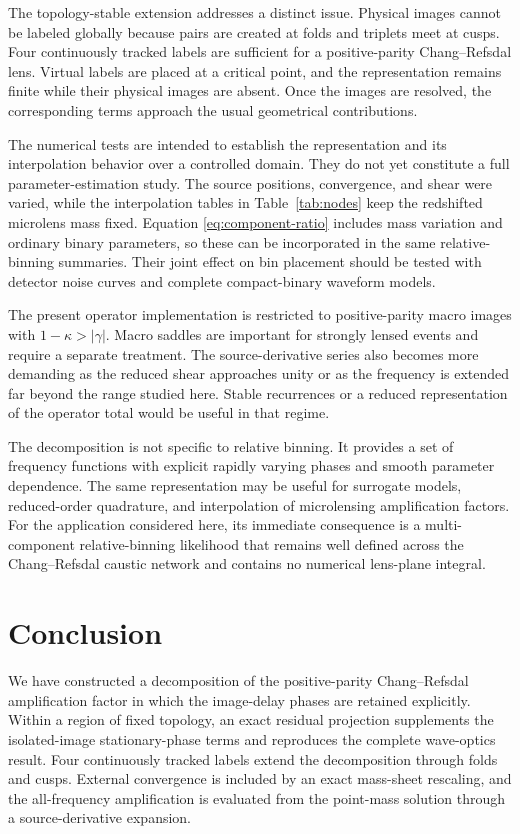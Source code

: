 \documentclass[aps,prd,twocolumn,nofootinbib,superscriptaddress,floatfix]{revtex4-2}
\begin{document}
The topology-stable extension addresses a distinct issue.  Physical images
cannot be labeled globally because pairs are created at folds and triplets
meet at cusps.  Four continuously tracked labels are sufficient for a
positive-parity Chang--Refsdal lens.  Virtual labels are placed at a critical
point, and the representation remains finite while their physical images are
absent.  Once the images are resolved, the corresponding terms approach the
usual geometrical contributions.

The numerical tests are intended to establish the representation and its
interpolation behavior over a controlled domain.  They do not yet constitute
a full parameter-estimation study.  The source positions, convergence, and
shear were varied, while the interpolation tables in
Table~\ref{tab:nodes} keep the redshifted microlens mass fixed.  Equation
\eqref{eq:component-ratio} includes mass variation and ordinary binary
parameters, so these can be incorporated in the same relative-binning
summaries.  Their joint effect on bin placement should be tested with detector
noise curves and complete compact-binary waveform models.

The present operator implementation is restricted to positive-parity macro
images with $1-\kappa>|\gamma|$.  Macro saddles are important for strongly
lensed events and require a separate treatment.  The source-derivative series
also becomes more demanding as the reduced shear approaches unity or as the
frequency is extended far beyond the range studied here.  Stable recurrences
or a reduced representation of the operator total would be useful in that
regime.

The decomposition is not specific to relative binning.  It provides a set of
frequency functions with explicit rapidly varying phases and smooth parameter
dependence.  The same representation may be useful for surrogate models,
reduced-order quadrature, and interpolation of microlensing amplification
factors.  For the application considered here, its immediate consequence is a
multi-component relative-binning likelihood that remains well defined across
the Chang--Refsdal caustic network and contains no numerical lens-plane
integral.

\section{Conclusion}
\label{sec:conclusion}

We have constructed a decomposition of the positive-parity Chang--Refsdal
amplification factor in which the image-delay phases are retained explicitly.
Within a region of fixed topology, an exact residual projection supplements
the isolated-image stationary-phase terms and reproduces the complete
wave-optics result.  Four continuously tracked labels extend the decomposition
through folds and cusps.  External convergence is included by an exact
mass-sheet rescaling, and the all-frequency amplification is evaluated from
the point-mass solution through a source-derivative expansion.
\end{document}
